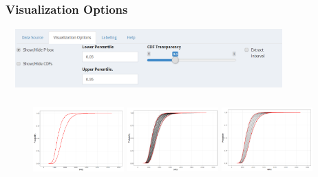\documentclass[handout, xcolor=dvipsnames]{beamer}
\begin{document}
\subsection{}
\begin{frame}
	\frametitle{Visualization Options}
	\begin{center} 
		\includegraphics[height=2.25cm,width=11cm]{figures/tab_vo.png}
	\end{center}
	\begin{figure}
	  \includegraphics[height=3cm,width=3.5cm]{figures/pbx.png}
	  \includegraphics[height=3cm,width=3.5cm]{figures/pbx_cdf_l.png}
	  \includegraphics[height=3cm,width=3.5cm]{figures/pbx_cdf_d.png}
	\end{figure}
\end{frame}
\end{document}
